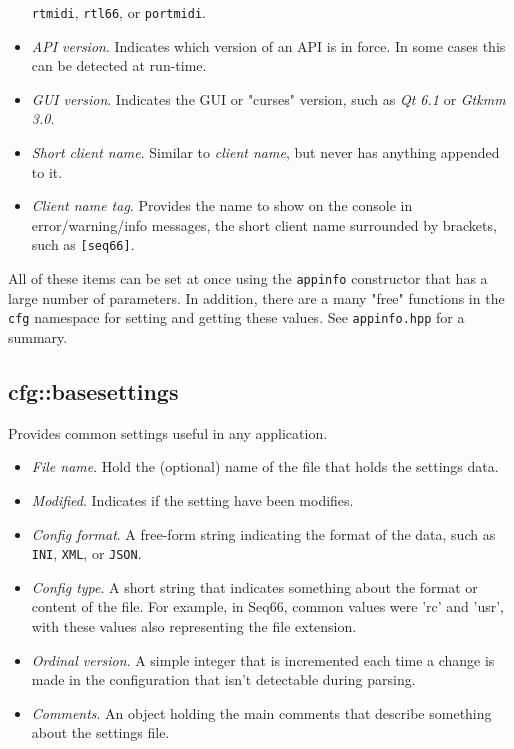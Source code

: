 \begin{itemize}
         \texttt{rtmidi},
         \texttt{rtl66},
         or \texttt{portmidi}.
      \item \textsl{API version}.
         Indicates which version of an API is in force.
         In some cases this can be detected at run-time.
      \item \textsl{GUI version}.
         Indicates the GUI or "curses" version, such as \textsl{Qt 6.1}
         or \textsl{Gtkmm 3.0}.
      \item \textsl{Short client name}.
         Similar to \textsl{client name}, but never has anything appended
         to it.
      \item \textsl{Client name tag}.
         Provides the name to show on the console in error/warning/info messages,
         the short client name surrounded by brackets, such as
         \texttt{[seq66]}.
   \end{itemize}

   All of these items can be set at once using the \texttt{appinfo}
   constructor that has a large number of parameters.
   In addition, there are a many "free" functions in the \texttt{cfg}
   namespace for setting and getting these values.
   See \texttt{appinfo.hpp} for a summary.

\subsection{cfg::basesettings}
\label{subsec:cfg_namespace_basesettings}

   Provides common settings useful in any application.

   \begin{itemize}
      \item \textsl{File name}.
         Hold the (optional) name of the file that holds the settings data.
      \item \textsl{Modified}.
         Indicates if the setting have been modifies.
      \item \textsl{Config format}.
         A free-form string indicating the format of the data, such as
         \texttt{INI}, \texttt{XML}, or \texttt{JSON}.
      \item \textsl{Config type}.
         A short string that indicates something about the
         format or content of the file. For example, in Seq66,
         common values were 'rc' and 'usr', with these
         values also representing the file extension.
      \item \textsl{Ordinal version}.
         A simple integer that is incremented each time a change is
         made in the configuration that isn't detectable during parsing.
      \item \textsl{Comments}.
         An object holding the main comments that describe something
         about the settings file.
   \end{itemize}

